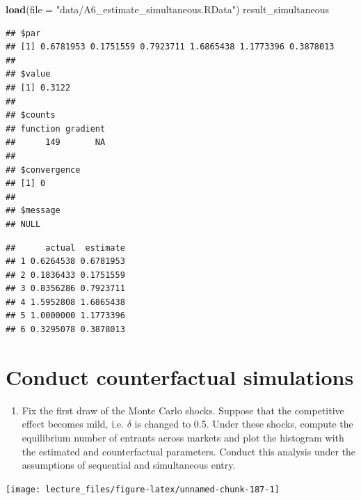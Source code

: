 \documentclass[]{book}
\newenvironment{Shaded}{\begin{snugshade}}{\end{snugshade}}
\newcommand{\KeywordTok}[1]{\textcolor[rgb]{0.13,0.29,0.53}{\textbf{#1}}}
\newcommand{\DataTypeTok}[1]{\textcolor[rgb]{0.13,0.29,0.53}{#1}}
\newcommand{\StringTok}[1]{\textcolor[rgb]{0.31,0.60,0.02}{#1}}
\newcommand{\OperatorTok}[1]{\textcolor[rgb]{0.81,0.36,0.00}{\textbf{#1}}}
\newcommand{\NormalTok}[1]{#1}
\providecommand{\tightlist}{%
  \setlength{\itemsep}{0pt}\setlength{\parskip}{0pt}}
\begin{document}
\begin{Shaded}
\begin{Highlighting}[]
\KeywordTok{load}\NormalTok{(}\DataTypeTok{file =} \StringTok{"data/A6_estimate_simultaneous.RData"}\NormalTok{)}
\NormalTok{result_simultaneous}
\end{Highlighting}
\end{Shaded}

\begin{verbatim}
## $par
## [1] 0.6781953 0.1751559 0.7923711 1.6865438 1.1773396 0.3878013
## 
## $value
## [1] 0.3122
## 
## $counts
## function gradient 
##      149       NA 
## 
## $convergence
## [1] 0
## 
## $message
## NULL
\end{verbatim}

\begin{Shaded}
\end{Shaded}

\begin{verbatim}
##      actual  estimate
## 1 0.6264538 0.6781953
## 2 0.1836433 0.1751559
## 3 0.8356286 0.7923711
## 4 1.5952808 1.6865438
## 5 1.0000000 1.1773396
## 6 0.3295078 0.3878013
\end{verbatim}

\section{Conduct counterfactual
simulations}\label{conduct-counterfactual-simulations}

\begin{enumerate}
\def\labelenumi{\arabic{enumi}.}
\tightlist
\item
  Fix the first draw of the Monte Carlo shocks. Suppose that the
  competitive effect becomes mild, i.e. \(\delta\) is changed to 0.5.
  Under these shocks, compute the equilibrium number of entrants across
  markets and plot the histogram with the estimated and counterfactual
  parameters. Conduct this analysis under the assumptions of sequential
  and simultaneous entry.
\end{enumerate}

\begin{center}\texttt{[image: lecture\_files/figure-latex/unnamed-chunk-187-1]} \end{center}
\end{document}

